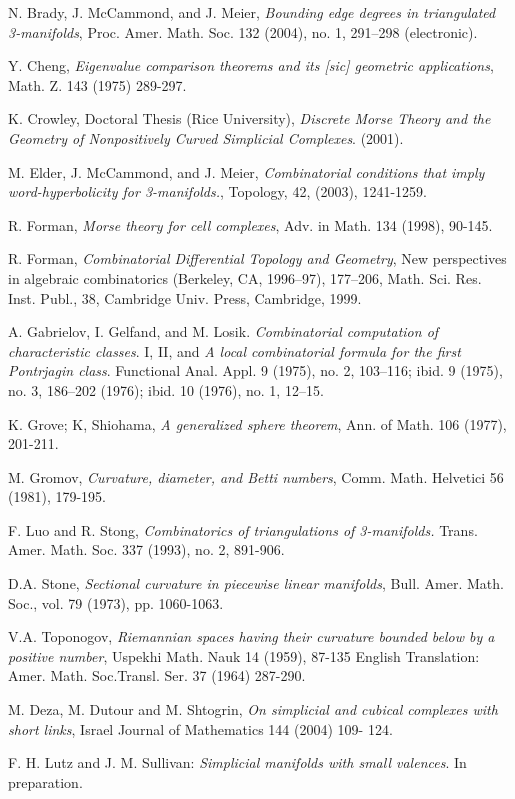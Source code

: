 \documentclass[12pt]{article}
\begin{document}
\begin{thebibliography}{99}

    N. Brady, J. McCammond, and J. Meier, {\em Bounding edge degrees in triangulated 3-manifolds}, Proc. Amer. Math. Soc. 132 (2004), no. 1, 291--298 (electronic).

    Y. Cheng, {\em Eigenvalue comparison theorems and its [sic] geometric applications}, Math. Z. 143 (1975) 289-297.

    K. Crowley, Doctoral Thesis (Rice University), {\em Discrete Morse Theory and the Geometry of Nonpositively Curved Simplicial Complexes}. (2001).

    M. Elder, J. McCammond, and J. Meier, {\em Combinatorial conditions that imply word-hyperbolicity for 3-manifolds.}, Topology, 42, (2003), 1241-1259.

    R. Forman, {\em Morse theory for cell complexes}, Adv. in Math. 134 (1998), 90-145.

    R. Forman, {\em Combinatorial Differential Topology and Geometry}, New perspectives in algebraic combinatorics (Berkeley, CA, 1996--97), 177--206, Math. Sci. Res. Inst. Publ., 38, Cambridge Univ. Press, Cambridge, 1999.

    A. Gabrielov, I. Gelfand, and M. Losik.  {\em Combinatorial computation of characteristic classes}. I, II, and {\em A local combinatorial formula for the first Pontrjagin class}. Functional Anal. Appl. 9 (1975), no. 2, 103--116; ibid. 9 (1975), no. 3, 186--202 (1976); ibid. 10 (1976), no. 1, 12--15.

    K. Grove; K, Shiohama, {\em A generalized sphere theorem}, Ann. of Math. 106 (1977), 201-211.

    M. Gromov, {\em Curvature, diameter, and Betti numbers}, Comm. Math. Helvetici 56 (1981), 179-195.

    F. Luo and R. Stong, {\em Combinatorics of triangulations of 3-manifolds.} Trans. Amer. Math. Soc. 337 (1993), no. 2, 891-906.

    D.A. Stone, {\em Sectional curvature in piecewise linear manifolds}, Bull. Amer. Math. Soc., vol. 79 (1973), pp. 1060-1063.

    V.A. Toponogov, {\em Riemannian spaces having their curvature bounded below by a positive number}, Uspekhi Math. Nauk 14 (1959), 87-135 English Translation: Amer. Math. Soc.Transl. Ser. 37 (1964) 287-290.

     M. Deza, M. Dutour and M. Shtogrin, {\em On simplicial and cubical complexes with short links}, Israel Journal of Mathematics 144 (2004) 109-
124.

     F. H. Lutz and J. M. Sullivan: {\em Simplicial manifolds with small valences}.
In preparation.


\end{thebibliography}
\end{document}
